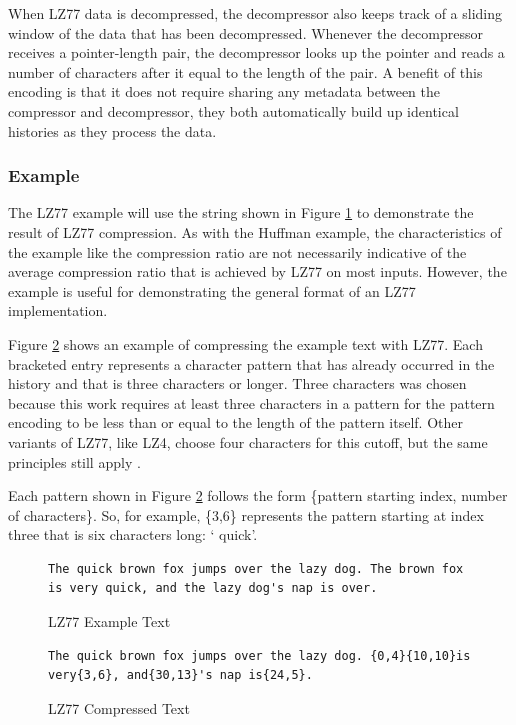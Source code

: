 \documentclass[doublespace,nopageskip]{VTthesis}
\begin{document}
When LZ77 data is decompressed, the decompressor also keeps track of a sliding window of the data that has been decompressed. Whenever the decompressor receives a pointer-length pair, the decompressor looks up the pointer and reads a number of characters after it equal to the length of the pair. A benefit of this encoding is that it does not require sharing any metadata between the compressor and decompressor, they both automatically build up identical histories as they process the data.

\subsubsection{Example}\label{sss:lz77_example}
The LZ77 example will use the string shown in Figure \ref{fig:lz77_example_text} to demonstrate the result of LZ77 compression. As with the Huffman example, the characteristics of the example like the compression ratio are not necessarily indicative of the average compression ratio that is achieved by LZ77 on most inputs. However, the example is useful for demonstrating the general format of an LZ77 implementation.

Figure \ref{fig:lz77_compressed_text} shows an example of compressing the example text with LZ77. Each bracketed entry represents a character pattern that has already occurred in the history and that is three characters or longer. Three characters was chosen because this work requires at least three characters in a pattern for the pattern encoding to be less than or equal to the length of the pattern itself. Other variants of LZ77, like LZ4, choose four characters for this cutoff, but the same principles still apply \cite{lz4}.

Each pattern shown in Figure \ref{fig:lz77_compressed_text} follows the form \{pattern starting index, number of characters\}. So, for example, \{3,6\} represents the pattern starting at index three that is six characters long: ` quick'.

\begin{figure}[htb]
	\centering
    \begin{lstlisting}
The quick brown fox jumps over the lazy dog. The brown fox is very quick, and the lazy dog's nap is over.
    \end{lstlisting}
	\caption{LZ77 Example Text}
	\label{fig:lz77_example_text}
\end{figure}

\begin{figure}[htb]
	\centering
    \begin{lstlisting}
The quick brown fox jumps over the lazy dog. {0,4}{10,10}is very{3,6}, and{30,13}'s nap is{24,5}.
    \end{lstlisting}
	\caption{LZ77 Compressed Text}
	\label{fig:lz77_compressed_text}
\end{figure}
\end{document}
